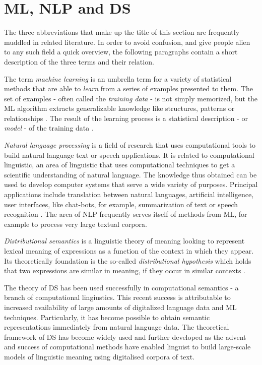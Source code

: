 \documentclass{article}
\begin{document}
\section{ML, NLP and DS}\hypertarget{sec2}{ }
The three abbreviations that make up the title of this section are frequently muddled in related literature. In order to avoid confusion, and give people alien to any such field a quick overview, the following paragraphs contain a short description of the three terms and their relation.
 
The term \emph{machine learning} is an umbrella term for a variety of statistical methods that are able to \emph{learn} from a series of examples presented to them. The set of examples - often called the \emph{training data} - is not simply memorized, but the ML algorithm extracts generalizable knowledge like structures, patterns or relationships \cite{domingos2012few}.
The result of the learning process is a statistical description - or \emph{model} - of the training data \cite{fayyad2001digital}.

\emph{Natural language processing} is a field of research that uses computational tools to build natural language text or speech applications. It is related to computational linguistic, an area of linguistic that uses computational techniques to get a scientific understanding of natural language. The knowledge thus obtained can be used  to develop computer systems that serve a wide variety of purposes. Principal applications include translation between natural languages, artificial intelligence, user interfaces, like chat-bots, for example, summarization of text or speech recognition \cite{chowdhury2003natural}. The area of NLP frequently serves itself of methods from ML, for example to process very large textual corpora. %

\emph{Distributional semantics} is a linguistic theory of meaning looking to represent lexical meaning of expressions as a function of the context in which they appear. Its theoretically foundation is the so-called \emph{distributional hypothesis} which holds that two expressions are similar in meaning, if they occur in similar contexts \cite{harris1954distributional}.

The theory of DS has been used successfully in computational semantics - a branch of computational lingiustics. This recent success is attributable to increased availability of large amounts of digitalized language data and ML techniques. Particularly, it has become possible to obtain semantic representations immediately from natural language data. The theoretical framework of DS has become widely used and further developed as the advent and success of computational methods have enabled linguist to build large-scale models of linguistic meaning using digitalised corpora of text. 
\end{document}

